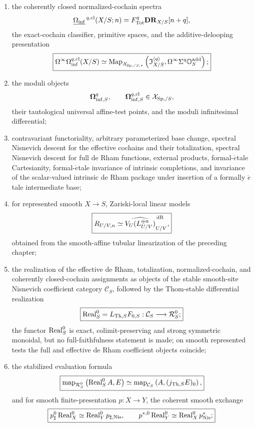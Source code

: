 \begin{theorem}
\begin{enumerate}
the kernel of \(\pi_0\Gamma_S^{\mathrm{st}}(\lambda^1_{X/S})\), so the canonical first-order
linearization is not an equivalence;
\item the coherently closed normalized-cochain spectra
\[
    \underline{\Omega_{\mathrm{inf}}}^{\,q,\mathrm{cl}}(X/S;n)
    =
    F_{\mathrm{Tot}}^q\mathbf{DR}_{X/S}[n+q],
\]
the exact-cochain classifier, primitive spaces, and the additive-delooping presentation
\[
\boxed{
    \Omega^\infty\Omega_{\mathrm{inf}}^{q,\mathrm{cl}}(X/S)
    \simeq
    \operatorname{Map}_{\mathcal X_{\mathrm{Sp},/S,*}}
    \left(
        \mathfrak I^{\langle q\rangle}_{X/S},
        \Omega^\infty\Sigma^q\mathbb O_S^{\mathrm{add}}
    \right);
}
\]
\item the moduli objects
\[
    \boldsymbol{\Omega}_{\mathrm{inf},S}^{q},
    \qquad
    \boldsymbol{\Omega}_{\mathrm{inf},S}^{q,\mathrm{cl}}
    \in
    \mathcal X_{\mathrm{Sp},/S},
\]
their tautological universal affine-test points, and the moduli infinitesimal differential;
\item contravariant functoriality, arbitrary parameterized base change, spectral Nisnevich descent for
the effective cochains and their totalization, spectral Nisnevich descent for full de Rham functions,
external products, formal-\(\acute{e}\)tale Cartesianity, formal-\(\acute{e}\)tale invariance of
intrinsic completions, and invariance of the scalar-valued intrinsic de Rham package under insertion
of a formally \(\acute{e}\)tale intermediate base;
\item for represented smooth \(X\to S\), Zariski-local linear models
\[
\boxed{
    R_{U/V,n}
    \simeq
    \widehat{V_U(L_{U/V}^{\oplus n})}^{\,\mathrm{dR}}_{U/V},
}
\]
obtained from the smooth-affine tubular linearization of the preceding chapter;
\item the realization of the effective de Rham, totalization, normalized-cochain, and coherently
closed-cochain assignments as objects of the stable smooth-site Nisnevich
coefficient category \(\mathcal C_S\), followed by the Thom-stable differential
realization
\[
\boxed{
    \operatorname{Real}^{0}_S
    =
    L_{\mathrm{Th},S}F_{0,S}:
    \mathcal C_S\longrightarrow\mathcal R_S^0;
}
\]
the functor \(\operatorname{Real}^{0}_S\) is exact, colimit-preserving and strong symmetric
monoidal, but no full-faithfulness statement is made; on smooth represented
tests the full and effective de Rham coefficient objects coincide;

\item the stabilized evaluation formula
\[
\boxed{
    \operatorname{map}_{\mathcal R_S^0}
    \left(
        \operatorname{Real}^{0}_SA,E
    \right)
    \simeq
    \operatorname{map}_{\mathcal C_S}
    \left(
        A,(j_{\mathrm{Th},S}E)_0
    \right),
}
\]
and for smooth finite-presentation \(p:X\to Y\), the coherent smooth exchange
\[
\boxed{
    p_\sharp^0\operatorname{Real}^{0}_X
    \simeq
    \operatorname{Real}^{0}_Yp_{\sharp,\mathrm{Nis}},
    \qquad
    p^{*,0}\operatorname{Real}^{0}_Y
    \simeq
    \operatorname{Real}^{0}_Xp^*_{\mathrm{Nis}};
}
\]


\end{enumerate}
\end{theorem}
